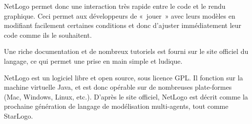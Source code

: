 NetLogo permet donc une interaction très rapide entre le code et le rendu graphique. Ceci permet aux développeurs de «~jouer~» avec leurs modèles en modifiant facilement certaines conditions et donc d'ajuster immédiatement leur code comme ils le souhaitent.

Une riche documentation et de nombreux tutoriels est fourni sur le site officiel du langage, ce qui permet une prise en main simple et ludique.

NetLogo est un logiciel libre et open source, sous licence GPL. Il fonction sur la machine virtuelle Java, et est donc opérable sur de nombreuses plate-formes (Mac, Windows, Linux, etc.).
D'après le site officiel, NetLogo est décrit comme la prochaine génération de langage de modélisation multi-agents, tout comme StarLogo.
